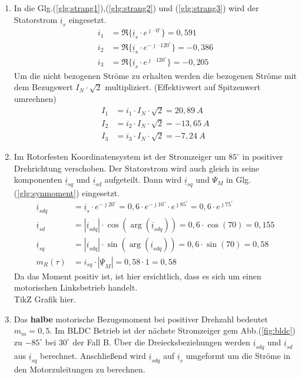 \begin{solution}
\begin{enumerate}
\item In die Glg.(\ref{glg:strang1}),(\ref{glg:strang2}) und (\ref{glg:strang3}) wird der Statorstrom $\underline{i}_s$ eingesetzt.
\begin{align}
i_1 & = \Re \{ \underline{i}_s \cdot e^{\jmath \cdot 0 ^\circ} \} = 0,591\\
i_2 & = \Re \{ \underline{i}_s \cdot e^{-\jmath \cdot 120 ^\circ} \} = -0,386 \\
i_3 & = \Re \{ \underline{i}_s \cdot e^{\jmath \cdot 120 ^\circ} \}=  -0,205
\end{align}
Um die nicht bezogenen Ströme zu erhalten werden die bezogenen Ströme mit dem Bezugswert $I_N \cdot \sqrt{2}$ multipliziert. (Effektivwert auf Spitzenwert umrechnen)
\begin{align}
I_1 & = i_1 \cdot I_N \cdot \sqrt{2}  =20,89~A \\
I_2 & = i_2 \cdot I_N \cdot \sqrt{2} =-13,65~A \\
I_3 & = i_3 \cdot I_N \cdot \sqrt{2} =-7,24~A
\end{align}
\item Im Rotorfesten Koordinatensystem ist der Stromzeiger um $85^\circ$ in positiver Drehrichtung verschoben. Der Statorstrom wird auch gleich in seine komponenten $\underline{i}_{sq}$ und $\underline{i}_{sd}$ aufgeteilt. Dann wird $\underline{i}_{sq}$ und $\Psi_M$ in Glg.(\ref{glg:synmoment}) eingesetzt.
\begin{align}
\underline{i}_{sdq} & = \underline{i}_s \cdot e^{-\jmath 20 ^\circ} = 0,6 \cdot e^{-\jmath 10 ^\circ} \cdot e^{\jmath 85 ^\circ} = 0,6 \cdot e^{\jmath 75 ^\circ} \\
\underline{i}_{sd} & = |\underline{i}_{sdq}| \cdot \cos(\arg(\underline{i}_{sdq})) = 0,6 \cdot \cos(70) = 0,155 \\
\underline{i}_{sq} & = |\underline{i}_{sdq}| \cdot \sin(\arg(\underline{i}_{sdq})) = 0,6 \cdot \sin(70) = 0,58 \\
m_R(\tau)& =  i_{sq} \cdot | \underline{\Psi}_M|= 0,58\cdot 1 = 0,58
\end{align}
Da das Moment positiv ist, ist hier ersichtlich, dass es sich um einen motorischen Linksbetrieb handelt.\\
TikZ Grafik hier.
\item Das \textbf{halbe} motorische Bezugsmoment bei positiver Drehzahl bedeutet $m_m = 0,5$. Im BLDC Betrieb ist der nächste Stromzeiger gem Abb.(\ref{fig:bldc}) zu $-85^\circ$ bei $30^\circ$ der Fall B. Über die Dreiecksbeziehungen werden $\underline{i}_{sdq}$ und $\underline{i}_{sd}$ aus $\underline{i}_{sq}$ berechnet. Anschließend wird $\underline{i}_{sdq}$ auf $\underline{i}_{s}$ umgeformt um die Ströme in den Motorzuleitungen zu berechnen.

\end{enumerate}
\end{solution}
